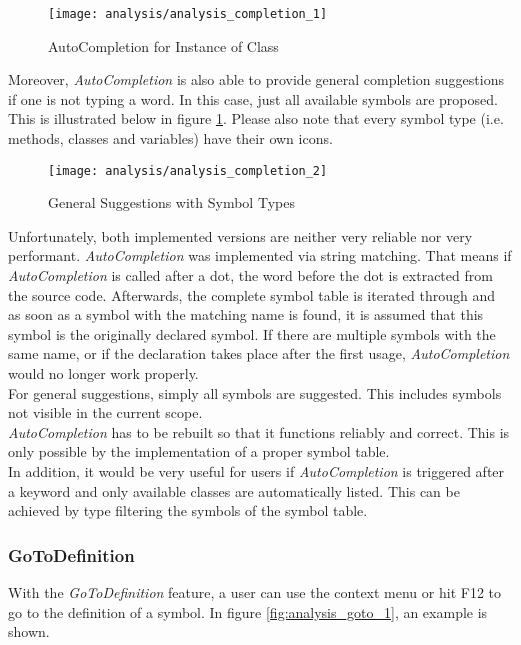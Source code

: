 \begin{figure}[H]
    \centering
    \texttt{[image: analysis/analysis\_completion\_1]}
    \caption{AutoCompletion for Instance of Class }
    \label{fig:analysis_completion_1}
\end{figure}

Moreover, \textit{AutoCompletion} is also able to provide general completion suggestions if one is not typing a word.
In this case, just all available symbols are proposed.
This is illustrated below in figure \ref{fig:analysis_completion_1}.
Please also note that every symbol type (i.e. methods, classes and variables) have their own icons.

\begin{figure}[H]
    \centering
    \texttt{[image: analysis/analysis\_completion\_2]}
    \caption{General Suggestions with Symbol Types}
    \label{fig:analysis_completion_2}
\end{figure}

Unfortunately, both implemented versions are neither very reliable nor very performant.
\textit{AutoCompletion} was implemented via string matching.
That means if \textit{AutoCompletion} is called after a dot, the word before the dot is extracted from the source code.
Afterwards, the complete symbol table is iterated through and as soon as a symbol with the matching name is found,
it is assumed that this symbol is the originally declared symbol.
If there are multiple symbols with the same name, or if the declaration takes place after the first usage,
\textit{AutoCompletion} would no longer work properly. \\

For general suggestions, simply all symbols are suggested.
This includes symbols not visible in the current scope. \\

\textit{AutoCompletion} has to be rebuilt so that it functions reliably and correct.
This is only possible by the implementation of a proper symbol table.\\

In addition, it would be very useful for users if \textit{AutoCompletion} is triggered after a 
keyword and only available classes are automatically listed.
This can be achieved by type filtering the symbols of the symbol table.

\subsubsection{GoToDefinition}
With the \textit{GoToDefinition} feature, a user can use the context menu or hit F12 to go to the definition of a symbol.
In figure \ref{fig:analysis_goto_1}, an example is shown.

